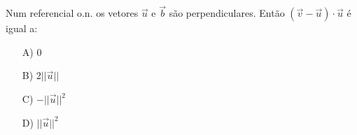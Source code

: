 Num referencial o.n. os vetores $\vec u$ e $\vec b$ são perpendiculares. Então $(\vec v - \vec u)\cdot \vec u$ é igual a:
\begin{enumerate}
\item [A)] 0
\item [B)] $2||\vec u || $
\item [C)] $ -|| \vec u ||^2$
\item [D)] $ || \vec u ||^2$
\end{enumerate}